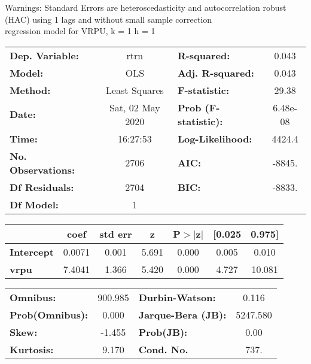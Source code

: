 Warnings: \newline
 [1] Standard Errors are heteroscedasticity and autocorrelation robust (HAC) using 1 lags and without small sample correction\\ 

regression model for VRPU, k = 1 h = 1\begin{center}
\begin{tabular}{lclc}
\toprule
\textbf{Dep. Variable:}    &       rtrn       & \textbf{  R-squared:         } &     0.043   \\
\textbf{Model:}            &       OLS        & \textbf{  Adj. R-squared:    } &     0.043   \\
\textbf{Method:}           &  Least Squares   & \textbf{  F-statistic:       } &     29.38   \\
\textbf{Date:}             & Sat, 02 May 2020 & \textbf{  Prob (F-statistic):} &  6.48e-08   \\
\textbf{Time:}             &     16:27:53     & \textbf{  Log-Likelihood:    } &    4424.4   \\
\textbf{No. Observations:} &        2706      & \textbf{  AIC:               } &    -8845.   \\
\textbf{Df Residuals:}     &        2704      & \textbf{  BIC:               } &    -8833.   \\
\textbf{Df Model:}         &           1      & \textbf{                     } &             \\
\bottomrule
\end{tabular}
\begin{tabular}{lcccccc}
                   & \textbf{coef} & \textbf{std err} & \textbf{z} & \textbf{P$> |$z$|$} & \textbf{[0.025} & \textbf{0.975]}  \\
\midrule
\textbf{Intercept} &       0.0071  &        0.001     &     5.691  &         0.000        &        0.005    &        0.010     \\
\textbf{vrpu}      &       7.4041  &        1.366     &     5.420  &         0.000        &        4.727    &       10.081     \\
\bottomrule
\end{tabular}
\begin{tabular}{lclc}
\textbf{Omnibus:}       & 900.985 & \textbf{  Durbin-Watson:     } &    0.116  \\
\textbf{Prob(Omnibus):} &   0.000 & \textbf{  Jarque-Bera (JB):  } & 5247.580  \\
\textbf{Skew:}          &  -1.455 & \textbf{  Prob(JB):          } &     0.00  \\
\textbf{Kurtosis:}      &   9.170 & \textbf{  Cond. No.          } &     737.  \\
\bottomrule
\end{tabular}
\end{center}

